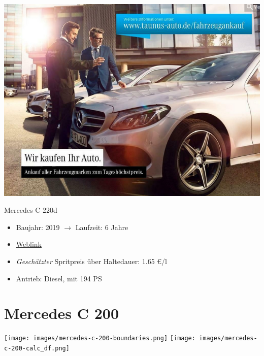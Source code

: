 \documentclass[landscape, DIV=99, 14pt]{scrartcl}
\begin{document}
\pagebreak
\null
\vspace{2cm}
\begin{center}
\includegraphics[width=0.9\columnwidth]{cars/mercedes-c-220d-t.png}

Mercedes C 220d
\end{center}

\begin{itemize}
    \item Baujahr: 2019 $\rightarrow$ Laufzeit: 6 Jahre
    \item \href{https://suchen.mobile.de/fahrzeuge/details.html?action=parkItem&id=336723447}{Weblink}
    \item \emph{Gesch\"atzter} Spritpreis \"uber Haltedauer: 1.65 \euro{}/l
    \item Antrieb: Diesel, mit 194 PS
\end{itemize}

\pagebreak


\twocolumn

\section*{Mercedes C 200}
\begin{center}
\texttt{[image: images/mercedes-c-200-boundaries.png]}
\null
\vspace{0.5cm}
\texttt{[image: images/mercedes-c-200-calc\_df.png]}
\end{center}
\end{document}
